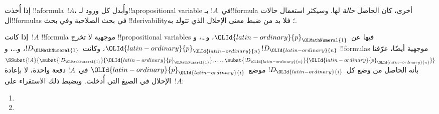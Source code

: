 \documentclass[../../../include/open-logic-section]{subfiles}
\begin{document}


إذا أُخذت !!a{formula}~$!A$، وأُبدل كل ورود لـ!!a{propositional variable}
في~$!A$ بـ!!{formula} أخرى، كان الحاصل \emph{حالة} لها. وسيكثر
استعمال حالات ال!!{formula}s في بحث الصلاحية وفي بحث
!!{derivability}؛ فلا بد من ضبط معنى الإحلال الذي تتولد به.

\begin{defn}
  إذا كانت~$!A$ !!{formula} موجهية لا تخرج !!{propositional
    variable}s فيها عن~${\OLId{latin-ordinary}{p}}_{\OLMathNumeral{1}}$، و\dots، و${\OLId{latin-ordinary}{p}}_{\OLId{latin-ordinary}{n}}$، وكانت~$!D_{\OLMathNumeral{1}}$، و\dots،
  و$!D_{\OLId{latin-ordinary}{n}}$ !!{formula}s موجهية أيضًا، عرّفنا
  $\SSubst{!A}{\subst{!D_{\OLMathNumeral{1}}}{{\OLId{latin-ordinary}{p}}_{\OLMathNumeral{1}}}, \dots, \subst{!D_{\OLId{latin-ordinary}{n}}}{{\OLId{latin-ordinary}{p}}_{\OLId{latin-ordinary}{n}}}}$ بأنه
  الحاصل من وضع كل~$!D_{\OLId{latin-ordinary}{i}}$ موضع~${\OLId{latin-ordinary}{p}}_{\OLId{latin-ordinary}{i}}$ في~$!A$ دفعة واحدة،
  لا بإعادة الإحلال في الصيغ التي أُدخلت. ويضبط ذلك الاستقراء على~$!A$:
  \begin{enumerate}
    \item {}
    \item {}

\end{enumerate}
\end{defn}
\end{document}
